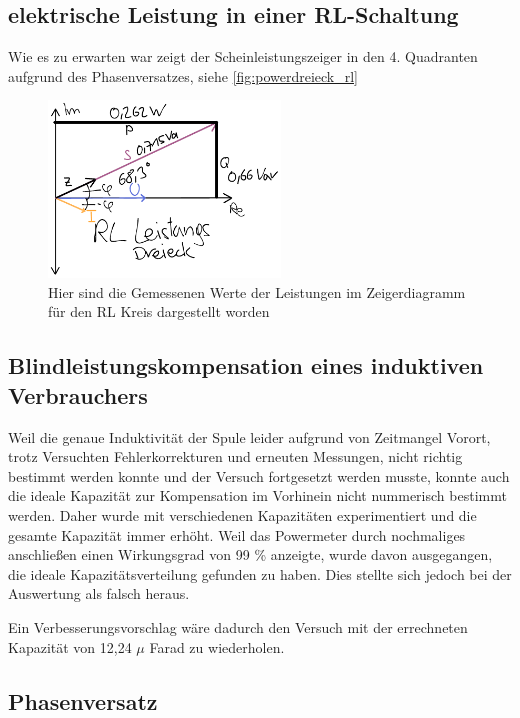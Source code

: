 \documentclass[11pt,ngerman]{scrartcl}
\begin{document}
\subsection{elektrische Leistung in einer RL-Schaltung}

Wie es zu erwarten war zeigt der Scheinleistungszeiger in den 4. Quadranten
aufgrund des Phasenversatzes, siehe \autoref{fig:powerdreieck_rl}

\begin{figure}[H]
	\begin{center}
		\includegraphics[width=0.55\textwidth]{./figures/rl_zeiger.pdf}
	\end{center}
	\caption{Hier sind die Gemessenen Werte der Leistungen im Zeigerdiagramm für den RL Kreis dargestellt worden}
	\label{fig:powerdreieck_rl}
\end{figure}


\subsection{Blindleistungskompensation eines induktiven Verbrauchers}

Weil die genaue Induktivität der Spule leider aufgrund von Zeitmangel Vorort,
trotz Versuchten Fehlerkorrekturen und erneuten Messungen, nicht richtig
bestimmt werden konnte und der Versuch fortgesetzt werden musste, konnte auch
die ideale Kapazität zur Kompensation im Vorhinein nicht nummerisch bestimmt
werden. Daher wurde mit verschiedenen Kapazitäten experimentiert und die
gesamte Kapazität immer erhöht. Weil das Powermeter durch nochmaliges
anschließen einen Wirkungsgrad von 99 \% anzeigte, wurde davon ausgegangen, die
ideale Kapazitätsverteilung gefunden zu haben. Dies stellte sich jedoch bei der
Auswertung als falsch heraus.

Ein Verbesserungsvorschlag wäre dadurch den Versuch mit der errechneten
Kapazität von 12,24 $\mu$ Farad zu wiederholen.


\subsection{Phasenversatz}
\end{document}
